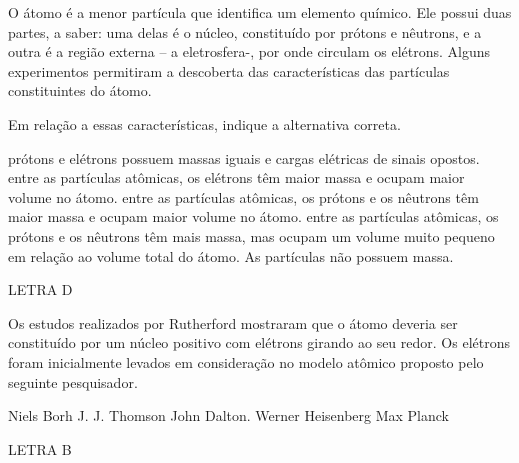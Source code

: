 \documentclass[9 pt]{scrartcl}
\def\PQ{0.84} %
\begin{document}




\begin{exercise}[points=\PQ]
O átomo é a menor partícula que identifica um elemento químico. Ele possui duas partes, a saber: uma delas é o núcleo, constituído por prótons e nêutrons, e a outra é a região externa – a eletrosfera-, por onde circulam os elétrons. Alguns experimentos permitiram a descoberta das características das partículas constituintes do átomo.

Em relação a essas características, indique a alternativa correta.

\begin{choice}
\choice prótons e elétrons possuem massas iguais e cargas elétricas de sinais opostos.
\choice  entre as partículas atômicas, os elétrons têm maior massa e ocupam maior volume no átomo.
\choice entre as partículas atômicas, os prótons e os nêutrons têm maior massa e ocupam maior volume no átomo.
\choice entre as partículas atômicas, os prótons e os nêutrons têm mais massa, mas ocupam um volume muito pequeno em relação ao volume total do átomo.
\choice As partículas não possuem massa.
\end{choice}
\end{exercise}
\begin{solution}
LETRA D
\end{solution}


\begin{exercise}[points=\PQ]
Os estudos realizados por Rutherford mostraram que o átomo deveria ser constituído por um núcleo positivo com elétrons girando ao seu redor. Os elétrons foram inicialmente levados em consideração no modelo atômico proposto pelo seguinte pesquisador.

\begin{choice}
\choice  Niels Borh
\choice J. J. Thomson
\choice John Dalton.
\choice  Werner Heisenberg
\choice Max Planck
\end{choice}
\end{exercise}
\begin{solution}
LETRA B
\end{solution}
\end{document}
